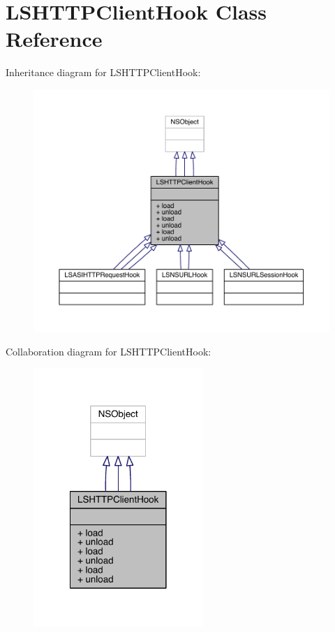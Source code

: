 \hypertarget{interface_l_s_h_t_t_p_client_hook}{\section{L\-S\-H\-T\-T\-P\-Client\-Hook Class Reference}
\label{interface_l_s_h_t_t_p_client_hook}
}


Inheritance diagram for L\-S\-H\-T\-T\-P\-Client\-Hook\-:\nopagebreak
\begin{figure}[H]
\begin{center}
\leavevmode
\includegraphics[width=350pt]{interface_l_s_h_t_t_p_client_hook__inherit__graph}
\end{center}
\end{figure}


Collaboration diagram for L\-S\-H\-T\-T\-P\-Client\-Hook\-:\nopagebreak
\begin{figure}[H]
\begin{center}
\leavevmode
\includegraphics[width=182pt]{interface_l_s_h_t_t_p_client_hook__coll__graph}
\end{center}
\end{figure}
